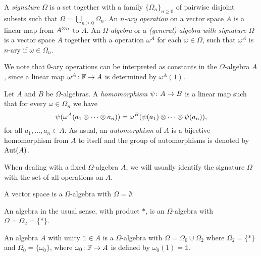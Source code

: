 \begin{defi}\label{def:universal-algebra}
    A \emph{signature} $\Omega$ is a set together with a family $\{ \Omega_n \}_{n \geq 0}$ of pairwise disjoint subsets such that $\Omega = \bigcup_{n \geq 0} \Omega_n$. 
    An \emph{$n$-ary operation} on a vector space $A$ is a linear map from $A^{\otimes n}$ to $A$. 
    An \emph{$\Omega$-algebra} or a \emph{(general) algebra with signature $\Omega$} is a vector space $A$ together with a operation $\omega^A$ for each $\omega \in \Omega$, such that $\omega^A$ is $n$-ary if $\omega \in \Omega_n$.
\end{defi}

We note that $0$-ary operations can be interpreted as constants in the $\Omega$-algebra $A$, since a linear map $\omega^A\colon \mathbb{F} \to A$ is determined by $\omega^A(1)$.

\begin{defi}
    Let $A$ and $B$ be $\Omega$-algebras. 
    A \emph{homomorphism} $\psi\colon A \to B$ is a linear map such that for every $\omega \in \Omega_n$ we have
    \[
        \psi( \omega^A (a_1 \otimes \cdots \otimes a_n) ) = \omega^B ( \psi(a_1) \otimes \cdots \otimes \psi(a_n) ),
    \]
    for all $a_1, \ldots, a_n \in A$. 
    As usual, an \emph{automorphism} of $A$ is a bijective homomorphism from $A$ to itself and the group of automorphisms is denoted by $\operatorname{Aut}(A)$.
\end{defi}

When dealing with a fixed $\Omega$-algebra $A$, we will usually identify the signature $\Omega$ with the set of all operations on $A$.

\begin{ex}\label{ex:omega-vec-space}
    A vector space is a $\Omega$-algebra with $\Omega = \emptyset$.
\end{ex}

\begin{ex}\label{ex:omega-algebra}
    An algebra in the usual sense, with product $*$, is an $\Omega$-algebra with $\Omega = \Omega_2 = \{ * \}$. 
\end{ex}

\begin{ex}
    An algebra $A$ with unity $\mathds{1} \in A$ is a  $\Omega$-algebra with $\Omega = \Omega_0 \cup \Omega_2$ where $\Omega_2 = \{ * \}$ and $\Omega_0 = \{ \omega_0 \}$, where $\omega_0\colon \mathbb{F} \to A$ is defined by $\omega_0 (1) = \mathds 1$.
\end{ex}

